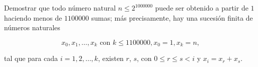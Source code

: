 Demostrar que todo número natural $n\leq 2^{1000000}$ puede ser obtenido a partir de $1$ haciendo menos de $1100000$ sumas; más precisamente, hay una sucesión finita de números naturales

\[x_0, x_1, \dots , x_k \text{ con } k\leq 1100000, x_0=1, x_k=n,\]

tal que para cada $i=1,2,\dots ,k$, existen $r$, $s$, con $0\leq r\leq s \lt i$ y $x_i=x_r+x_s$. 